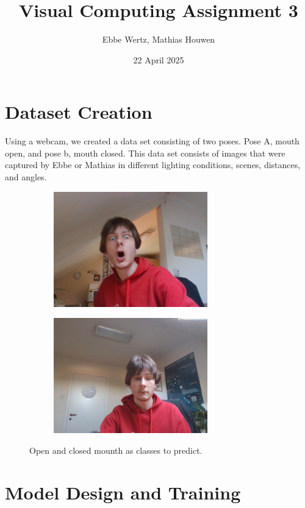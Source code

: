 \documentclass{report}
\title{Visual Computing Assignment 3}
\author{Ebbe Wertz, Mathias Houwen}
\date{22 April 2025}
\begin{document}
\maketitle

\section{Dataset Creation}
\label{sec:dataset}
Using a webcam, we created a data set consisting of two poses. Pose A, mouth open, and pose b, mouth closed. This data set consists of images that were captured by Ebbe or Mathias in different lighting conditions, scenes, distances, and angles.


\begin{figure}[H]
    \centering
    \begin{subfigure}[b]{0.45\linewidth}
        \centering
        \includegraphics[height=50mm, keepaspectratio]{report_images/train_ebbe_A.jpg}
    \end{subfigure}
    \hfill
    \begin{subfigure}[b]{0.45\linewidth}
        \centering
        \includegraphics[height=50mm, keepaspectratio]{report_images/train_ebbe_B.jpg}
    \end{subfigure}
    \caption{Open and closed mounth as classes to predict.}
    \label{fig:graycode}
\end{figure}

\section{Model Design and Training}
\end{document}
